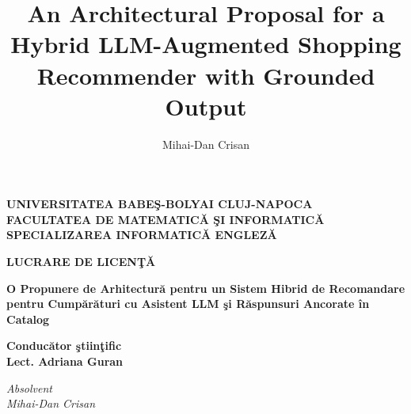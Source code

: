 \documentclass[12pt]{report}
\begin{document}
\title{An Architectural Proposal for a Hybrid LLM-Augmented
Shopping Recommender with Grounded Output}
\author{Mihai-Dan Crisan}

\maketitle

\begin{titlepage}
  \begin{center}
    {\Large\textbf{
      UNIVERSITATEA BABE\c S-BOLYAI CLUJ-NAPOCA \\
      FACULTATEA DE MATEMATIC\u A \c SI INFORMATIC\u A \\
      SPECIALIZAREA INFORMATIC\u A ENGLEZ\u A \\
    }}
  \end{center}

  \vspace{10em}

  \begin{center}
    {\Huge\textbf{LUCRARE DE LICEN\c T\u A}}
  \end{center}

  \vspace{3em}

  \begin{center}
    {\huge\textbf{O Propunere de Arhitectur\u a pentru un
    Sistem Hibrid de Recomandare pentru Cump\u ar\u aturi cu
    Asistent LLM \c si R\u aspunsuri Ancorate \^in Catalog}}
  \end{center}

  \vspace{10em}

  \begin{flushleft}
    {\Large\textbf{Conduc\u ator \c stiin\c tific \\ Lect. Adriana Guran}}
  \end{flushleft}

  \vspace{3em}

  \begin{flushright}
    {\Large\textit{Absolvent \\ Mihai-Dan Crisan}}
  \end{flushright}

  \vfill

  \begin{center}
    {\Large{\the\year}}
  \end{center}
\end{titlepage}
\end{document}

